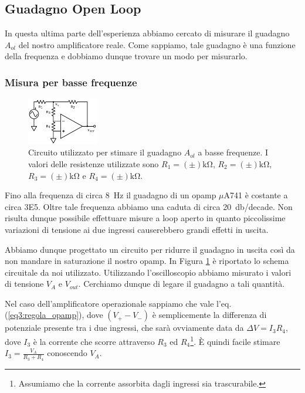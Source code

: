 \subsection{Guadagno Open Loop}
\label{par3:open}

In questa ultima parte dell'esperienza abbiamo cercato di misurare il guadagno $A_{ol}$ del nostro amplificatore reale.
Come sappiamo, tale guadagno è una funzione della frequenza e dobbiamo dunque trovare un modo per misurarlo.

\subsubsection{Misura per basse frequenze}

\begin{figure}
  \begin{center}
    \includegraphics[width=0.280\textwidth]{../E03/latex/LF_ol.pdf}
  \end{center}
  \caption{Circuito utilizzato per stimare il guadagno $A_{ol}$ a basse frequenze. I valori delle resistenze utilizzate sono $R_1 = (\pm) \si{\kilo\ohm}$, $R_2 = (\pm) \si{\kilo\ohm}$, $R_3 = (\pm) \si{\kilo\ohm}$ e $R_4 = (\pm) \si{\kilo\ohm}$.}
  \label{cir3:low_frequency}
\end{figure}

Fino alla frequenza di circa \SI{8}{\hertz} il guadagno di un opamp $\mu$A741 è costante a circa \num{3E5}.
Oltre tale frequenza abbiamo una caduta di circa \SI{20}{\decibel}/decade.
Non risulta dunque possibile effettuare misure a loop aperto in quanto piccolissime variazioni di tensione ai due ingressi causerebbero grandi effetti in uscita.

Abbiamo dunque progettato un circuito per ridurre il guadagno in uscita così da non mandare in saturazione il nostro opamp.
In Figura \ref{cir3:low_frequency} è riportato lo schema circuitale da noi utilizzato.
Utilizzando l'oscilloscopio abbiamo misurato i valori di tensione $V_A$ e $V_{out}$. Cerchiamo dunque di legare il guadagno a tali quantità.

Nel caso dell'amplificatore operazionale sappiamo che vale l'eq. (\ref{eq3:regola_opamp}), dove $(V_+-V_-)$ è semplicemente la differenza di potenziale presente tra i due ingressi, che sarà ovviamente data da $\Delta V = I_3R_4$, dove $I_3$ è la corrente che scorre attraverso $R_3$ ed $R_4$\footnote{Assumiamo che la corrente assorbita dagli ingressi sia trascurabile.}.
È quindi facile stimare $I_3=\frac{V_A}{R_3+R_4}$ conoscendo $V_A$.

